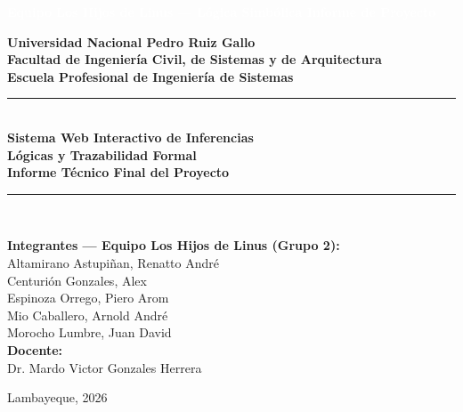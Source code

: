 \documentclass[11pt,a4paper]{article}
\begin{document}
\begin{titlepage}
    \begin{tcolorbox}[colback=headerblue,arc=0mm,boxrule=0pt,height=1.2cm,valign=center]
        \centering
        \textcolor{white}{\small\textbf{Equipo Los Hijos de Linus — Lógica Simbólica \hfill Informe de Proyecto}}
    \end{tcolorbox}
    
    \vspace{2.2cm}
    \begin{center}
        {\Large\textbf{Universidad Nacional Pedro Ruiz Gallo}}\\[0.3cm]
        {\large\textbf{Facultad de Ingeniería Civil, de Sistemas y de Arquitectura}}\\[0.2cm]
        {\normalsize\textbf{Escuela Profesional de Ingeniería de Sistemas}}\\[1.2cm]
        
        \textcolor{headerblue}{\rule{0.85\textwidth}{1.5pt}}\\[0.8cm]
        
        {\LARGE\textbf{\textcolor{headerblue}{Sistema Web Interactivo de Inferencias}}}\\[0.3cm]
        {\LARGE\textbf{\textcolor{headerblue}{Lógicas y Trazabilidad Formal}}}\\[0.5cm]
        {\large\textbf{Informe Técnico Final del Proyecto}}\\[0.8cm]
        
        \textcolor{headerblue}{\rule{0.85\textwidth}{1.5pt}}\\[1.8cm]
        
        \begin{minipage}{0.85\textwidth}
            \centering
            \textbf{\large Integrantes — Equipo Los Hijos de Linus (Grupo 2):}\\[0.4cm]
            {\normalsize
            Altamirano Astupiñan, Renatto André\\
            Centurión Gonzales, Alex\\
            Espinoza Orrego, Piero Arom\\
            Mio Caballero, Arnold André\\
            Morocho Lumbre, Juan David\\[1.2cm]
            }
            \textbf{\large Docente:}\\
            Dr. Mardo Victor Gonzales Herrera
        \end{minipage}
        
        \vfill
        {\small Lambayeque, 2026}
    \end{center}
\end{titlepage}
\end{document}
